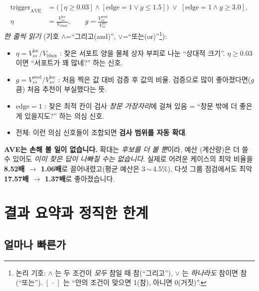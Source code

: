 \documentclass[11pt,a4paper]{article}
\begin{document}
\begin{equation}
\begin{aligned}
\mathrm{trigger}_{\mathrm{AVE}}
&=\big([\eta\ge0.03]\wedge[\mathrm{edge}=1\vee g\le1.5]\big)\;\vee\;[\mathrm{edge}=1\wedge g\ge3.0],\\[2pt]
\eta&=\frac{V_{ss}^{\mathrm{loc}}}{V_{\mathrm{bbox}}},\qquad
g=\frac{V_{ss}^{\mathrm{seed}}}{V_{ss}^{\mathrm{loc}}}
\end{aligned}
\label{eq:ave}
\end{equation}
\noindent\textit{한 줄씩 읽기} (기호 $\wedge$=``그리고(and)'', $\vee$=``또는(or)''\footnote{논리
기호: $\wedge$ 는 두 조건이 \emph{모두} 참일 때 참(``그리고''), $\vee$ 는 \emph{하나라도}
참이면 참(``또는''). $[\,\cdot\,]$ 는 ``안의 조건이 맞으면 1(참), 아니면 0(거짓)''.}):
\begin{itemize}[leftmargin=1.6em]
\item $\eta=V_{ss}^{\mathrm{loc}}/V_{\mathrm{bbox}}$ : 찾은 서포트 양을 물체 상자
부피로 나눈 ``상대적 크기''. $\eta\ge0.03$ 이면 ``서포트가 꽤 많네?'' 하는 신호.
\item $g=V_{ss}^{\mathrm{seed}}/V_{ss}^{\mathrm{loc}}$ : 처음 찍은 값 대비 검증 후
값의 비율. 검증으로 많이 좋아졌다면($g$ 큼) 처음 추천이 부실했다는 뜻.
\item $\mathrm{edge}=1$ : 찾은 최적 칸이 검사 \emph{창문 가장자리}에 걸쳐 있음 =
``창문 밖에 더 좋은 게 있을지도?'' 하는 의심 신호.
\item 전체: 이런 의심 신호들이 조합되면 \textbf{검사 범위를 자동 확대}.
\end{itemize}

\begin{notebox}
\textbf{AVE는 손해 볼 일이 없습니다.} 확대는 \emph{후보를 더 볼 뿐}이라, 예산
(계산량)은 더 쓸 수 있어도 \emph{이미 찾은 답이 나빠질 수는 없습니다}. 실제로 어려운
케이스의 최악 비율을 \textbf{8.52배 $\to$ 1.06배}로 끌어내렸고(평균 예산은 3\,$\sim$\,4.5\%),
다섯 그룹 점검에서도 최악 \textbf{17.57배 $\to$ 1.37배}로 좋아졌습니다.
\end{notebox}

\section{결과 요약과 정직한 한계}

\subsection{얼마나 빠른가}
\end{document}
